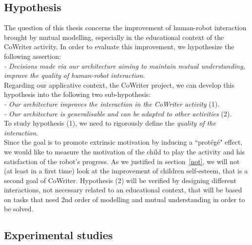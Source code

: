 \documentclass[10pt,a4paper]{article}
\begin{document}
\subsection{Hypothesis}

The question of this thesis concerns the improvement of human-robot interaction brought by mutual modelling, especially in the educational context of the CoWriter activity. In order to evaluate this improvement, we hypothesize the following assertion:\\

\textit{- Decisions made via our architecture aiming to maintain mutual understanding, improve the quality of human-robot interaction.}\\

Regarding our applicative context, the CoWriter project, we can develop this hypothesis into the following two sub-hypothesis:\\

\textit{- Our architecture improves the interaction in the CoWriter activity} (1).\\
\textit{- Our architecture is generalisable and can be adapted to other activities} (2).\\

To study hypothesis (1), we need to rigorously define the \textit{quality of the interaction}.\\
Since the goal is to promote extrinsic motivation by inducing a ``prot\'eg\'e" effect, we would like to measure the motivation of the child to play the activity and his satisfaction of the robot's progress. As we justified in section~\ref{not}, we will not (at least in a first time) look at the improvement of children self-esteem, that is a second goal of CoWriter. 
Hypothesis (2) will be verified by designing different interactions, not necessary related to an educational context, that will be based on tasks that need 2nd order of modelling and mutual understanding in order to be solved.
\subsection{Experimental studies}
\end{document}
